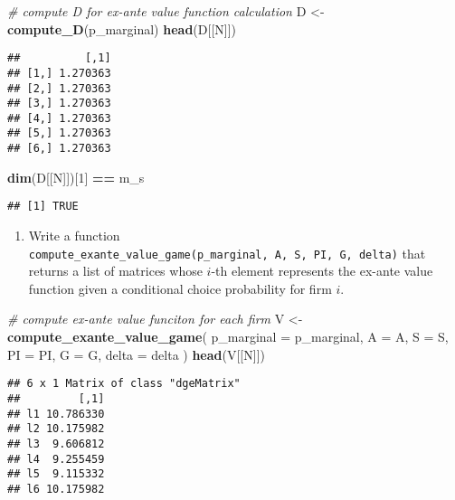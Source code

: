 \documentclass[
]{book}
\newenvironment{Shaded}{\begin{snugshade}}{\end{snugshade}}
\newcommand{\AttributeTok}[1]{\textcolor[rgb]{0.13,0.29,0.53}{#1}}
\newcommand{\CommentTok}[1]{\textcolor[rgb]{0.56,0.35,0.01}{\textit{#1}}}
\newcommand{\DecValTok}[1]{\textcolor[rgb]{0.00,0.00,0.81}{#1}}
\newcommand{\FunctionTok}[1]{\textcolor[rgb]{0.13,0.29,0.53}{\textbf{#1}}}
\newcommand{\NormalTok}[1]{#1}
\newcommand{\OtherTok}[1]{\textcolor[rgb]{0.56,0.35,0.01}{#1}}
\newcommand{\SpecialCharTok}[1]{\textcolor[rgb]{0.81,0.36,0.00}{\textbf{#1}}}
\providecommand{\tightlist}{%
  \setlength{\itemsep}{0pt}\setlength{\parskip}{0pt}}
\begin{document}
\begin{Shaded}
\begin{Highlighting}[]
\CommentTok{\# compute D for ex{-}ante value function calculation}
\NormalTok{D }\OtherTok{\textless{}{-}} \FunctionTok{compute\_D}\NormalTok{(p\_marginal)}
\FunctionTok{head}\NormalTok{(D[[N]])}
\end{Highlighting}
\end{Shaded}

\begin{verbatim}
##          [,1]
## [1,] 1.270363
## [2,] 1.270363
## [3,] 1.270363
## [4,] 1.270363
## [5,] 1.270363
## [6,] 1.270363
\end{verbatim}

\begin{Shaded}
\begin{Highlighting}[]
\FunctionTok{dim}\NormalTok{(D[[N]])[}\DecValTok{1}\NormalTok{] }\SpecialCharTok{==}\NormalTok{ m\_s}
\end{Highlighting}
\end{Shaded}

\begin{verbatim}
## [1] TRUE
\end{verbatim}

\begin{enumerate}
\def\labelenumi{\arabic{enumi}.}
\setcounter{enumi}{6}
\tightlist
\item
  Write a function \texttt{compute\_exante\_value\_game(p\_marginal,\ A,\ S,\ PI,\ G,\ delta)} that returns a list of matrices whose \(i\)-th element represents the ex-ante value function given a conditional choice probability for firm \(i\).
\end{enumerate}

\begin{Shaded}
\begin{Highlighting}[]
\CommentTok{\# compute ex{-}ante value funciton for each firm}
\NormalTok{V }\OtherTok{\textless{}{-}} 
  \FunctionTok{compute\_exante\_value\_game}\NormalTok{(}
    \AttributeTok{p\_marginal =}\NormalTok{ p\_marginal,}
    \AttributeTok{A =}\NormalTok{ A,}
    \AttributeTok{S =}\NormalTok{ S,}
    \AttributeTok{PI =}\NormalTok{ PI,}
    \AttributeTok{G =}\NormalTok{ G,}
    \AttributeTok{delta =}\NormalTok{ delta}
\NormalTok{    )}
\FunctionTok{head}\NormalTok{(V[[N]])}
\end{Highlighting}
\end{Shaded}

\begin{verbatim}
## 6 x 1 Matrix of class "dgeMatrix"
##         [,1]
## l1 10.786330
## l2 10.175982
## l3  9.606812
## l4  9.255459
## l5  9.115332
## l6 10.175982
\end{verbatim}
\end{document}
